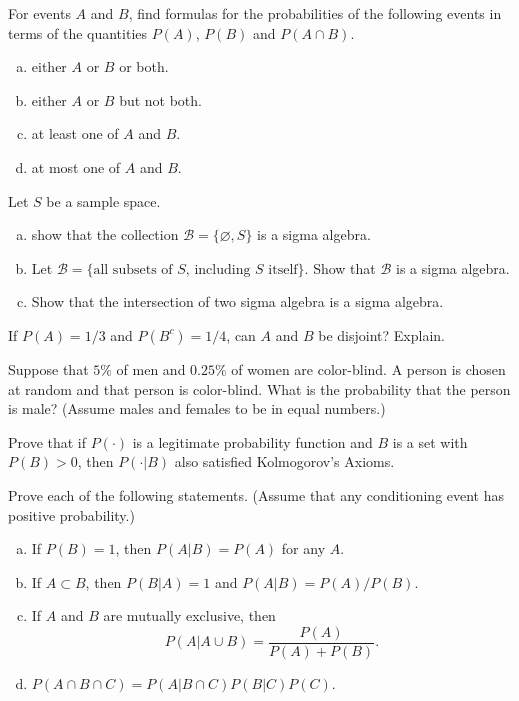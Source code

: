 \documentclass[12pt]{elegantbook}
\begin{document}
\begin{exercise}
    For events $A$ and $B$, find formulas for the probabilities of the following events in terms of the quantities $P(A)$, $P(B)$ and $P(A\cap B)$. 
    \begin{enumerate}[(a)]
        \item either $A$ or $B$ or both. 
        \item either $A$ or $B$ but not both. 
        \item at least one of $A$ and $B$.
        \item at most one of $A$ and $B$.
    \end{enumerate}
\end{exercise}

\setcounter{exer}{10}
\begin{exercise}
    Let $S$ be a sample space. 
    \begin{enumerate}[(a)]
        \item show that the collection $\mathcal{B}=\{\varnothing, S\}$ is a sigma algebra. 
        \item Let $\mathcal{B}=\{\text{all subsets of $S$, including $S$ itself}\}$. Show that $\mathcal{B}$ is a sigma algebra. 
        \item Show that the intersection of two sigma algebra is a sigma algebra.
    \end{enumerate}
\end{exercise}

\setcounter{exer}{12}
\begin{exercise}
    If $P(A)=1/3$ and $P(B^c)=1/4$, can $A$ and $B$ be disjoint? Explain. 
\end{exercise}

\setcounter{exer}{32}
\begin{exercise}
    Suppose that $5\%$ of men and $0.25\%$ of women are color-blind. A person is chosen at random and that person is color-blind. What is the probability that the person is male? (Assume males and females to be in equal numbers.)
\end{exercise}

\setcounter{exer}{34}
\begin{exercise}
    Prove that if $P(\cdot)$ is a legitimate probability function and $B$ is a set with $P(B)>0$, then $P(\cdot|B)$ also satisfied Kolmogorov's Axioms. 
\end{exercise}

\setcounter{exer}{37}
\begin{exercise}
    Prove each of the following statements. (Assume that any conditioning event has positive probability.)
    \begin{enumerate}[(a)]
        \item If $P(B)=1$, then $P(A|B)=P(A)$ for any $A$. 
        \item If $A\subset B$, then $P(B|A)=1$ and $P(A|B)=P(A)/P(B)$. 
        \item If $A$ and $B$ are mutually exclusive, then \[
            P(A|A\cup B)=\frac{P(A)}{P(A)+P(B)}. 
        \]
        \item $P(A\cap B\cap C)=P(A|B\cap C)P(B|C)P(C)$. 
    \end{enumerate}
\end{exercise}
\end{document}
